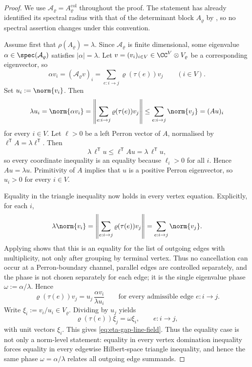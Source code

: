 \begin{proof}
  We use \(\mathcal A_\varrho=A_\varrho^{\mathrm{col}}\) throughout the proof. The statement
  has already identified its spectral radius with that of the determinant
  block \(A_\varrho\) by
  , so no spectral
  assertion changes under this convention.

  Assume first that \(\rho(A_\varrho)=\lambda\). Since
  \(\mathcal A_\varrho\) is finite dimensional, some eigenvalue
  \(\alpha\in\spec(\mathcal A_\varrho)\) satisfies
  \(|\alpha|=\lambda\). Let
  \(v=(v_i)_{i\in V}\in \CC^V\otimes V_\varrho\) be a corresponding
  eigenvector, so
  \[
    \alpha v_i=(\mathcal A_\varrho v)_i
    =\sum_{e:i\to j}\varrho(\tau(e))v_j
    \qquad (i\in V).
  \]
  Set \(u_i:=\norm{v_i}\). Then
  \[
    \lambda u_i
    =
    \norm{\alpha v_i}
    =
    \left\|\sum_{e:i\to j}\varrho(\tau(e))v_j\right\|
    \le
    \sum_{e:i\to j}\norm{v_j}
    =(Au)_i
  \]
  for every \(i\in V\). Let \(\ell>0\) be a left Perron vector of
  \(A\), normalised by \(\ell^{\mathsf T}A=\lambda\ell^{\mathsf T}\).
  Then
  \[
    \lambda\,\ell^{\mathsf T}u
    \le
    \ell^{\mathsf T}Au
    =
    \lambda\,\ell^{\mathsf T}u,
  \]
  so every coordinate inequality is an equality because \(\ell_i>0\)
  for all \(i\). Hence \(Au=\lambda u\). Primitivity of \(A\) implies
  that \(u\) is a positive Perron eigenvector, so \(u_i>0\) for every
  \(i\in V\).

  Equality in the triangle inequality now holds in every vertex equation.
  Explicitly, for each \(i\),
  \[
    \lambda\norm{v_i}
    =
    \left\|\sum_{e:i\to j}\varrho(\tau(e))v_j\right\|
    =
    \sum_{e:i\to j}\norm{v_j}.
  \]
  Applying  shows that this is an
  equality for the list of outgoing edges with multiplicity, not only after
  grouping by terminal vertex.  Thus no cancellation can occur at a
  Perron-boundary channel, parallel edges are controlled separately, and the
  phase is not chosen separately for each edge; it is the single eigenvalue
  phase \(\omega:=\alpha/\lambda\).  Hence
  \[
    \varrho(\tau(e))v_j
    =
    u_j\,\frac{\alpha v_i}{\lambda u_i}
    \qquad
    \text{for every admissible edge } e:i\to j.
  \]
  Write \(\xi_i:=v_i/u_i\in V_\varrho\). Dividing by \(u_j\) yields
  \[
    \varrho(\tau(e))\xi_j=\omega\xi_i,
    \qquad e:i\to j,
  \]
  with unit vectors \(\xi_i\).  This gives
  \eqref{eq:eta-gap-line-field}.  Thus the equality case is not only a
  norm-level statement: equality in every vertex domination inequality forces
  equality in every edgewise Hilbert-space triangle inequality, and hence the
  same phase \(\omega=\alpha/\lambda\) relates all outgoing edge summands.


\end{proof}
